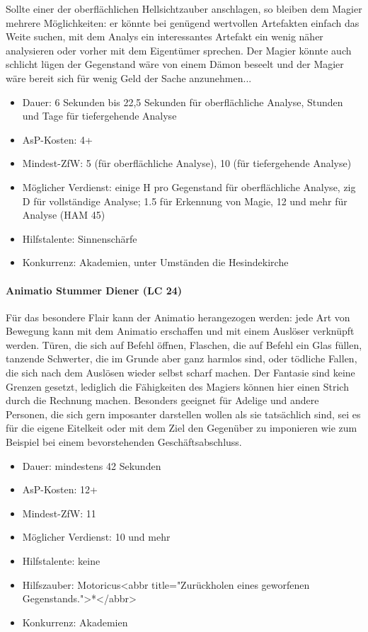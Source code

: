 Sollte einer der oberflächlichen Hellsichtzauber anschlagen, so bleiben dem Magier mehrere Möglichkeiten: er könnte bei genügend wertvollen Artefakten einfach das Weite suchen, mit dem Analys ein interessantes Artefakt ein wenig näher analysieren oder vorher mit dem Eigentümer sprechen. Der Magier könnte auch schlicht lügen der Gegenstand wäre von einem Dämon beseelt und der Magier wäre bereit sich für wenig Geld der Sache anzunehmen...
\begin{itemize}
	\item Dauer: 6 Sekunden bis 22,5 Sekunden für oberflächliche Analyse, Stunden und Tage für tiefergehende Analyse
	\item AsP-Kosten: 4+
	\item Mindest-ZfW: 5 (für oberflächliche Analyse), 10 (für tiefergehende Analyse)
	\item Möglicher Verdienst: einige H pro Gegenstand für oberflächliche Analyse, zig D für vollständige Analyse; \SI{1,5}{\D} für Erkennung von Magie, \SI{12}{\D} und mehr für Analyse (HAM 45)
	\item Hilfstalente: Sinnenschärfe
	\item Konkurrenz: Akademien, unter Umständen die Hesindekirche
\end{itemize}

\paragraph{Animatio Stummer Diener (LC 24)}
Für das besondere Flair kann der Animatio herangezogen werden: jede Art von Bewegung kann mit dem Animatio erschaffen und mit einem Auslöser verknüpft werden. Türen, die sich auf Befehl öffnen, Flaschen, die auf Befehl ein Glas füllen, tanzende Schwerter, die im Grunde aber ganz harmlos sind, oder tödliche Fallen, die sich nach dem Auslösen wieder selbst scharf machen. Der Fantasie sind keine Grenzen gesetzt, lediglich die Fähigkeiten des Magiers können hier einen Strich durch die Rechnung machen. Besonders geeignet für Adelige und andere Personen, die sich gern imposanter darstellen wollen als sie tatsächlich sind, sei es für die eigene Eitelkeit oder mit dem Ziel den Gegenüber zu imponieren wie zum Beispiel bei einem bevorstehenden Geschäftsabschluss.
\begin{itemize}
	\item Dauer: mindestens 42 Sekunden
	\item AsP-Kosten: 12+
	\item Mindest-ZfW: 11
	\item Möglicher Verdienst: \SI{10}{\D} und mehr
	\item Hilfstalente: keine
	\item Hilfszauber: Motoricus<abbr title="Zurückholen eines geworfenen Gegenstands.">*</abbr>
	\item Konkurrenz: Akademien
\end{itemize}

